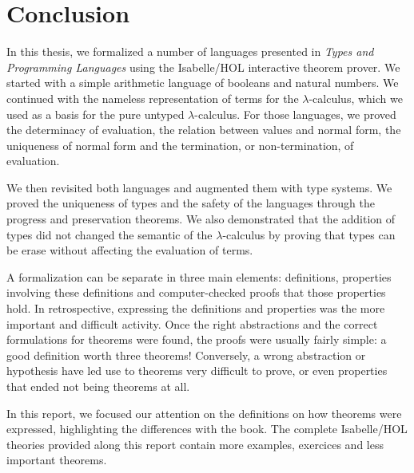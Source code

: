 \section{Conclusion}

In this thesis, we formalized a number of languages presented in \emph{Types and Programming
Languages} using the Isabelle/HOL interactive theorem prover. We started with a simple arithmetic
language of booleans and natural numbers. We continued with the nameless representation of terms for
the $\lambda$-calculus, which we used as a basis for the pure untyped $\lambda$-calculus. For those
languages, we proved the determinacy of evaluation, the relation between values and normal form, the
uniqueness of normal form and the termination, or non-termination, of evaluation.

We then revisited both languages and augmented them with type systems. We proved the uniqueness of
types and the safety of the languages through the progress and preservation theorems. We also
demonstrated that the addition of types did not changed the semantic of the $\lambda$-calculus by
proving that types can be erase without affecting the evaluation of terms.

A formalization can be separate in three main elements: definitions, properties involving these
definitions and computer-checked proofs that those properties hold. In retrospective, expressing the
definitions and properties was the more important and difficult activity. Once the right
abstractions and the correct formulations for theorems were found, the proofs were usually fairly
simple: a good definition worth three theorems! Conversely, a wrong abstraction or hypothesis
have led use to theorems very difficult to prove, or even properties that ended not being theorems
at all.

In this report, we focused our attention on the definitions on how theorems were expressed,
highlighting the differences with the book. The complete Isabelle/HOL theories provided along this
report contain more examples, exercices and less important theorems.

